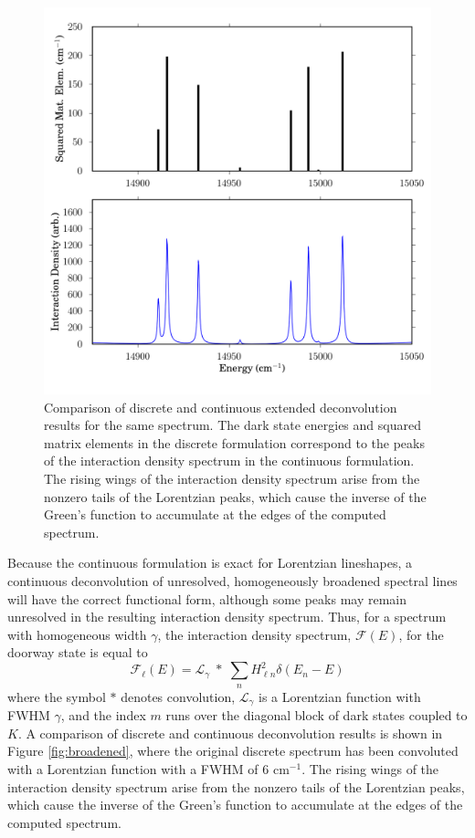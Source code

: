 \begin{figure}
  \caption{Comparison of discrete and continuous extended
    deconvolution results for the same spectrum.  The dark state
    energies and squared matrix elements in the discrete formulation
    correspond to the peaks of the interaction density spectrum in the
    continuous formulation. The rising wings of the interaction
    density spectrum arise from the nonzero tails of the Lorentzian
    peaks, which cause the inverse of the Green's function to
    accumulate at the edges of the computed spectrum.}
  \label{fig:compare-dark}
  \centering
  \includegraphics[width=6in]{smalley-compare-fwhm1.png}
\end{figure}

Because the continuous formulation is exact for Lorentzian lineshapes,
a continuous deconvolution of unresolved, homogeneously broadened
spectral lines will have the correct functional form, although some
peaks may remain unresolved in the resulting interaction density
spectrum.  Thus, for a spectrum with homogeneous width $\gamma$, the
interaction density spectrum, $\mathcal{F}(E)$, for the doorway state is
equal to
\begin{equation}
  \mathcal{F}_{\ell}(E) = 
    \mathcal{L}_{\gamma} \; * \;
    \sum_n H_{\ell n}^2 \delta(E_n - E)
\end{equation}
where the symbol $*$ denotes convolution, $\mathcal{L}_{\gamma}$ is a
Lorentzian function with FWHM $\gamma$, and the index $m$ runs over
the diagonal block of dark states coupled to $K$.  A comparison of
discrete and continuous deconvolution results is shown in Figure
\ref{fig:broadened}, where the original discrete spectrum has been
convoluted with a Lorentzian function with a FWHM of 6 cm$^{-1}$.  The
rising wings of the interaction density spectrum arise from the
nonzero tails of the Lorentzian peaks, which cause the inverse of the
Green's function to accumulate at the edges of the computed spectrum.


